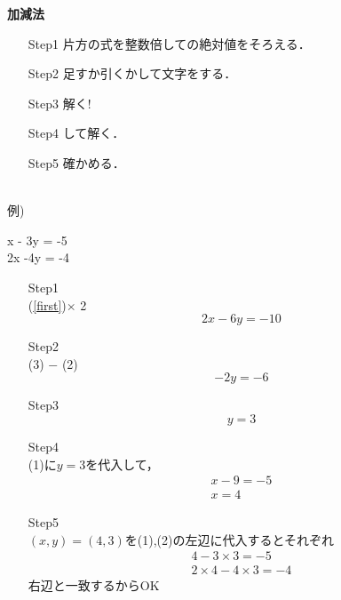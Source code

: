 \documentclass[b4paper,16.5pt,paparesize, landscape]{ltjsarticle}%
\begin{document}
{\textbf{\Large{加減法}}}\hspace{\fill}{\scalebox{1.5}{（　）組（　　　　　　　　）}}\\
\begin{multicols*}{3}
	\begin{screen}
		\vspace{5mm}
	\begin{enumerate}
	 \item[Step1]
			片方の式を整数倍して\underbar{\hspace{20mm}}の絶対値をそろえる．\\
	 \item[Step2]
			足すか引くかして文字を\underbar{\hspace{20mm}}する．\\
	 \item[Step3]
		 解く!\\
	 \item[Step4]
		 \underbar{\hspace{20mm}}して解く．\\
	 \item[Step5]
		 確かめる．\\
\end{enumerate}
	\end{screen}
	\\[10pt]
	例)
	\begin{numcases}
		{}
		x - 3y = -5 \label{first}\\
		2x -4y = -4 \label{second}
	\end{numcases}
\begin{enumerate}
	\item[Step1]\hfill\\
		(\ref{first})$\times$ 2\\
		\begin{equation}
			2x - 6y = -10
		\end{equation}
	\item[Step2]\hfill\\
		(3) $ - $ (2)
			\begin{equation*}
				-2y = -6
			\end{equation*}
	\item[Step3]\hfill\\
		\begin{equation*}
			y = 3
		\end{equation*}
	\item[Step4]\hfill\\
		(1)に$y=3$を代入して，
		\begin{gather*}
			x - 9 = -5\\
			x = 4
		\end{gather*}
	\item[Step5]\hfill\\	
		$(x,y) = (4,3)$を(1),(2)の左辺に代入するとそれぞれ
		\begin{eqnarray*}
			4 - 3\times 3 = -5 \\
			2\times 4 - 4\times 3 = -4
		\end{eqnarray*}
		右辺と一致するからOK
		

\end{enumerate}
\end{multicols*}
\end{document}
